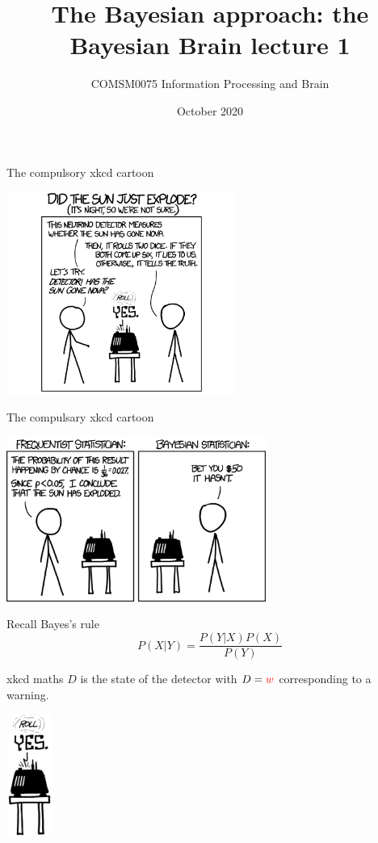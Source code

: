 \documentclass{beamer}
\title[The Bayesian Brain lecture 1]{The Bayesian approach: the Bayesian Brain lecture 1}
\author{COMSM0075 Information Processing and Brain}
\institute{\texttt{comsm0075.github.io}}
\date{October 2020}
\newcommand{\crish}{\color{reddish}}
\newcommand{\cbla}{\color{black}}
\newcommand{\cred}{\color{red}}
\begin{document}
\maketitle

\begin{frame}{The compulsory xkcd cartoon}
\begin{center}
\includegraphics[width=7.5cm]{xkcd1.png}
\end{center}
\vfill
{}
\end{frame}


\begin{frame}{The compulsary xkcd cartoon}
\begin{center}
\includegraphics[width=8.5cm]{xkcd2.png}
\end{center}
\vfill
{}
\end{frame}

\begin{frame}{Recall Bayes's rule}
  \crish$$
  P(X|Y)=\frac{P(Y|X)P(X)}{P(Y)}
  $$\cbla
\end{frame}

\begin{frame}{xkcd maths}
  \crish$D$\cbla{} is the state of the detector with
  \crish$D=\cred{}w$\cbla{} corresponding to a \cred{}warning\cbla{}.
\begin{center}
\includegraphics[width=1.5cm]{xkcd_detector.png}
\end{center}
\end{frame}
\end{document}
